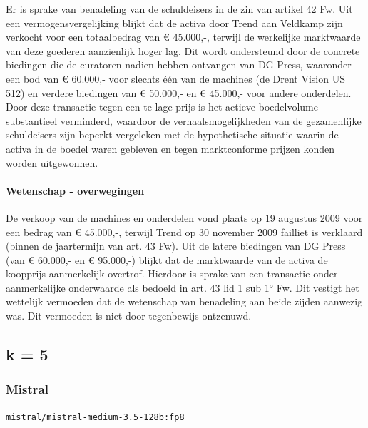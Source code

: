 \documentclass[
  dutch,
  a4paper,
]{article}
\begin{document}
Er is sprake van benadeling van de schuldeisers in de zin van artikel 42 Fw. Uit een vermogensvergelijking blijkt dat de activa door Trend aan Veldkamp zijn verkocht voor een totaalbedrag van € 45.000,-, terwijl de werkelijke marktwaarde van deze goederen aanzienlijk hoger lag. Dit wordt ondersteund door de concrete biedingen die de curatoren nadien hebben ontvangen van DG Press, waaronder een bod van € 60.000,- voor slechts één van de machines (de Drent Vision US 512) en verdere biedingen van € 50.000,- en € 45.000,- voor andere onderdelen. Door deze transactie tegen een te lage prijs is het actieve boedelvolume substantieel verminderd, waardoor de verhaalsmogelijkheden van de gezamenlijke schuldeisers zijn beperkt vergeleken met de hypothetische situatie waarin de activa in de boedel waren gebleven en tegen marktconforme prijzen konden worden uitgewonnen.

\paragraph{Wetenschap - overwegingen}\label{wetenschap---overwegingen-65}

De verkoop van de machines en onderdelen vond plaats op 19 augustus 2009 voor een bedrag van € 45.000,-, terwijl Trend op 30 november 2009 failliet is verklaard (binnen de jaartermijn van art. 43 Fw). Uit de latere biedingen van DG Press (van € 60.000,- en € 95.000,-) blijkt dat de marktwaarde van de activa de koopprijs aanmerkelijk overtrof. Hierdoor is sprake van een transactie onder aanmerkelijke onderwaarde als bedoeld in art. 43 lid 1 sub 1° Fw. Dit vestigt het wettelijk vermoeden dat de wetenschap van benadeling aan beide zijden aanwezig was. Dit vermoeden is niet door tegenbewijs ontzenuwd.

\newpage


\subsection{k = 5}\label{k-5-7}

\subsubsection{Mistral}\label{mistral-22}

\texttt{mistral/mistral-medium-3.5-128b:fp8}
\end{document}
